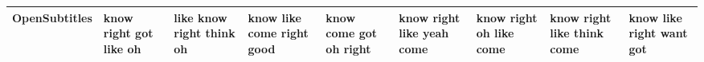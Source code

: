 \documentclass[11pt,a4paper]{article}
\begin{document}
\begin{appendices}
\begin{table*}[htb]
\begin{tiny}
\begin{tabular}{|p{}|p{}|p{}|p{}|p{}|p{}|p{}|p{}|p{}|}
    OpenSubtitles & know \newline right \newline got \newline like \newline oh & like \newline know \newline right \newline think \newline oh & know \newline like \newline come \newline right \newline good & know \newline come \newline got \newline oh \newline right & know \newline right \newline like \newline yeah \newline come & know \newline right \newline oh \newline like \newline come & know \newline right \newline like \newline think \newline come & know \newline like \newline right \newline want \newline got\\\hline

\end{tabular}
\end{tiny}
\end{table*}
\end{appendices}
\end{document}
